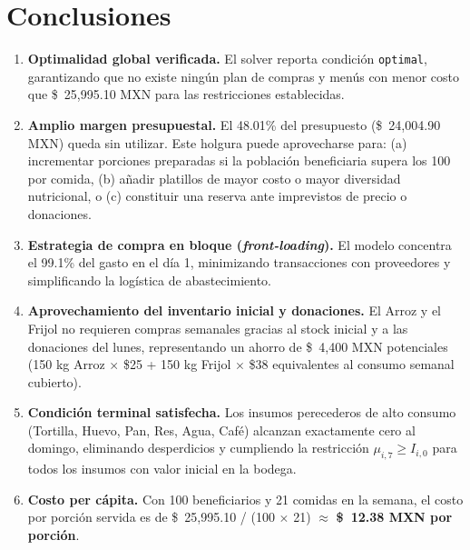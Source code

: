 \documentclass[12pt, a4paper]{article}
\begin{document}
\section{Conclusiones}

\begin{enumerate}
    \item \textbf{Optimalidad global verificada.} El solver reporta condición \texttt{optimal},
          garantizando que no existe ningún plan de compras y menús con menor costo que
          \$~25{,}995.10 MXN para las restricciones establecidas.

    \item \textbf{Amplio margen presupuestal.} El 48.01\% del presupuesto (\$~24{,}004.90 MXN)
          queda sin utilizar. Este holgura puede aprovecharse para: (a) incrementar porciones
          preparadas si la población beneficiaria supera los 100 por comida, (b) añadir platillos
          de mayor costo o mayor diversidad nutricional, o (c) constituir una reserva ante
          imprevistos de precio o donaciones.

    \item \textbf{Estrategia de compra en bloque (\emph{front-loading}).} El modelo concentra
          el 99.1\% del gasto en el día 1, minimizando transacciones con proveedores y
          simplificando la logística de abastecimiento.

    \item \textbf{Aprovechamiento del inventario inicial y donaciones.} El Arroz y el Frijol
          no requieren compras semanales gracias al stock inicial y a las donaciones del
          lunes, representando un ahorro de \$~4{,}400 MXN potenciales (150 kg Arroz $\times$
          \$25 + 150 kg Frijol $\times$ \$38 equivalentes al consumo semanal cubierto).

    \item \textbf{Condición terminal satisfecha.} Los insumos perecederos de alto consumo
          (Tortilla, Huevo, Pan, Res, Agua, Café) alcanzan exactamente cero al domingo,
          eliminando desperdicios y cumpliendo la restricción $\mu_{i,7} \geq I_{i,0}$
          para todos los insumos con valor inicial en la bodega.

    \item \textbf{Costo per cápita.} Con 100 beneficiarios y 21 comidas en la semana, el
          costo por porción servida es de \$~25{,}995.10 / (100 $\times$ 21)
          $\approx$ \textbf{\$~12.38 MXN por porción}.
\end{enumerate}
\end{document}
